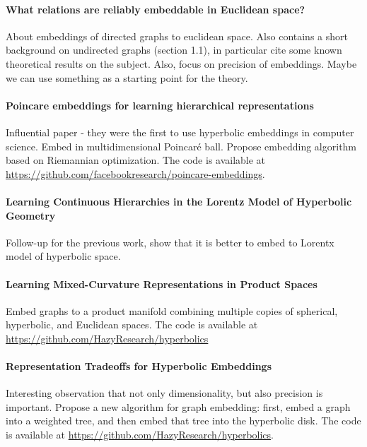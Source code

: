 \documentclass{article}
\begin{document}
\paragraph{What relations are reliably embeddable in Euclidean space?~\cite{bhattacharjee2019relations}}

About embeddings of directed graphs to euclidean space. Also contains a short background on undirected graphs (section 1.1), in particular cite some known theoretical results on the subject. Also, focus on precision of embeddings. Maybe we can use something as a starting point for the theory. 

\paragraph{Poincare embeddings for learning hierarchical representations~\cite{nickel2017poincare}}

Influential paper - they were the first to use hyperbolic embeddings in computer science.
Embed in multidimensional Poincar{\'e} ball. Propose embedding algorithm based on Riemannian optimization. The code is available at \url{https://github.com/facebookresearch/poincare-embeddings}.

\paragraph{Learning Continuous Hierarchies in the Lorentz Model of Hyperbolic Geometry~\cite{nickel2018learning}}

Follow-up for the previous work, show that it is better to embed to Lorentx model of hyperbolic space. 

\paragraph{Learning Mixed-Curvature Representations in Product Spaces~\cite{gu2019learning}}

Embed graphs to a product manifold combining multiple copies of spherical,
hyperbolic, and Euclidean spaces. The code is available at \url{https://github.com/HazyResearch/hyperbolics}

\paragraph{Representation Tradeoffs for Hyperbolic Embeddings~\cite{sala2018representation}}

Interesting observation that not only dimensionality, but also precision is important.
Propose a new algorithm for graph embedding: first, embed a graph into a weighted tree, and then embed that tree into the hyperbolic disk. The code is available at \url{https://github.com/HazyResearch/hyperbolics}.
\end{document}
